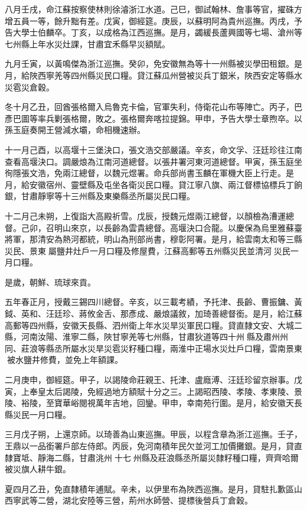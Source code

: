 \begin{pinyinscope}
八月壬戌，命江蘇按察使林則徐濬浙江水道。己巳，御試翰林、詹事等官，擢硃方增五員一等，餘升黜有差。戊寅，御經筵。庚辰，以蘇明阿為貴州巡撫。丙戌，予告大學士伯麟卒。丁亥，以成格為江西巡撫。是月，蠲緩長蘆興國等七場、滄州等七州縣上年水災灶課，甘肅宜禾縣早災額賦。

九月壬寅，以黃鳴傑為浙江巡撫。癸卯，免安徽無為等十一州縣被災學田租銀。是月，給陜西寧羌等四州縣災民口糧。貸江蘇瓜州營被災兵丁銀米，陜西安定等縣水災雹災倉穀。

冬十月乙丑，回酋張格爾入烏魯克卡倫，官軍失利，侍衛花山布等陣亡。丙子，巴彥巴圖等率兵剿張格爾，敗之。張格爾奔喀拉提錦。甲申，予告大學士章煦卒。以孫玉庭奏開王營減水壩，命相機速辦。

十一月己酉，以高堰十三堡決口，張文浩交部嚴議。辛亥，命文孚、汪廷珍往江南查看高堰決口。調嚴烺為江南河道總督。以張井署河東河道總督。甲寅，孫玉庭坐徇隱張文浩，免兩江總督，以魏元煜署。命兵部尚書玉麟在軍機大臣上行走。是月，給安徽宿州、靈壁縣及屯坐各衛災民口糧。貸江寧八旗、兩江督標協標兵丁餉銀，甘肅靜寧等十三州縣及東樂縣丞所屬災民口糧。

十二月己未朔，上復詣大高殿祈雪。戊辰，授魏元煜兩江總督，以顏檢為漕運總督。己卯，召明山來京，以長齡為雲貴總督。高堰決口合龍。以慶保為烏里雅蘇臺將軍，那清安為熱河都統，明山為刑部尚書，穆彰阿署。是月，給雲南太和等三縣災民、景東屬鹽井灶戶一月口糧及修屋費，江蘇高郵等五州縣災民並清河災民一月口糧。

是歲，朝鮮、琉球來貢。

五年春正月，授戴三錫四川總督。辛亥，以三載考績，予托津、長齡、曹振鏞、黃鉞、英和、汪廷珍、蔣攸金舌、那彥成、嚴烺議敘，加琦善總督銜。是月，給江蘇高郵等四州縣，安徽天長縣、泗州衛上年水災旱災軍民口糧。貸直隸文安、大城二縣，河南汝陽、淮寧二縣，陜甘寧羌等七州縣，甘肅狄道等四十州縣及肅州州同、莊浪等縣丞所屬水災旱災雹災籽種口糧，兩淮中正場水災灶戶口糧，雲南景東被水鹽井修費，並免上年額課。

二月庚申，御經筵。甲子，以謁陵命莊親王、托津、盧廕溥、汪廷珍留京辦事。戊寅，上奉皇太后謁陵，免經過地方額賦十分之三。上謁昭西陵、孝陵、孝東陵、景陵、裕陵，至寶華峪閱視萬年吉地，回鑾。甲申，幸南苑行圍。是月，給安徽天長縣災民一月口糧。

三月戊子朔，上還京師。以琦善為山東巡撫。甲辰，以程含章為浙江巡撫。壬子，王鼎以一品銜署戶部左侍郎。丙辰，免河南積年民欠並河工加價攤銀。是月，貸直隸寶坻、靜海二縣，甘肅洮州十七州縣及莊浪縣丞所屬災隸籽種口糧，齊齊哈爾被災旗人耕牛銀。

夏四月乙丑，免直隸積年逋賦。辛未，以伊里布為陜西巡撫。是月，貸駐扎歉區山西寧武等二營，湖北安陸等三營，荊州水師營、提標後營兵丁倉穀。


\end{pinyinscope}
